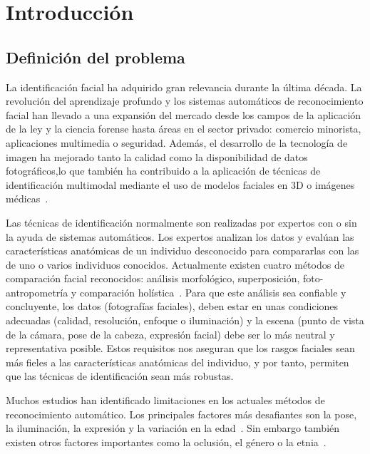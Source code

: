 \chapter{Introducción}
\thispagestyle{empty}

\section{Definición del problema}
La identificación facial ha adquirido gran relevancia durante la última década. La revolución del aprendizaje profundo y los sistemas automáticos de reconocimiento facial han llevado a una expansión del mercado desde los campos de la aplicación de la ley y la ciencia forense hasta áreas en el sector privado: comercio minorista, aplicaciones multimedia o seguridad. Además, el desarrollo de la tecnología de imagen ha mejorado tanto la calidad como la disponibilidad de datos fotográficos,lo que también ha contribuido a la aplicación de técnicas de identificación multimodal mediante el uso de modelos faciales en 3D o imágenes médicas~\cite{1,2}.

Las técnicas de identificación normalmente son realizadas por expertos con o sin la ayuda de sistemas automáticos. Los expertos analizan los datos y evalúan las características anatómicas de un individuo desconocido para compararlas con las de uno o varios individuos conocidos. Actualmente existen cuatro métodos de comparación facial reconocidos: análisis morfológico, superposición, foto-antropometría y comparación holística~\cite{3}.
Para que este análisis sea confiable y concluyente, los datos (fotografías faciales), deben estar en unas condiciones adecuadas (calidad, resolución, enfoque o iluminación) y la escena (punto de vista de la cámara, pose de la cabeza, expresión facial) debe ser lo más neutral y representativa posible. Estos requisitos nos aseguran que los rasgos faciales sean más fieles a las características anatómicas del individuo, y por tanto, permiten que las técnicas de identificación sean más robustas.

Muchos estudios han identificado limitaciones en los actuales métodos de reconocimiento automático. Los principales factores más desafiantes son la pose, la iluminación, la expresión y la variación en la edad~\cite{4,6}. Sin embargo también existen otros factores importantes como la oclusión, el género o la etnia~\cite{5,7}.

